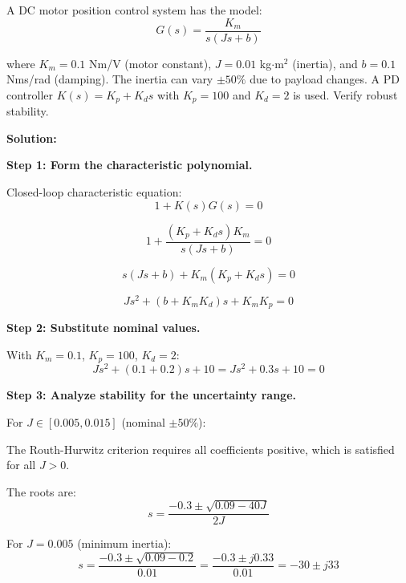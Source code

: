 \begin{example}
\label{ex:parametric_robustness}
A DC motor position control system has the model:
\begin{equation}
G(s) = \frac{K_m}{s(Js + b)}
\end{equation}

where $K_m = 0.1$ Nm/V (motor constant), $J = 0.01$ kg$\cdot$m$^2$ (inertia), and $b = 0.1$ Nms/rad (damping). The inertia can vary $\pm 50\%$ due to payload changes. A PD controller $K(s) = K_p + K_d s$ with $K_p = 100$ and $K_d = 2$ is used. Verify robust stability.

\textbf{Solution:}

\textbf{Step 1: Form the characteristic polynomial.}

Closed-loop characteristic equation:
\begin{equation}
1 + K(s)G(s) = 0
\end{equation}

\begin{equation}
1 + \frac{(K_p + K_d s)K_m}{s(Js + b)} = 0
\end{equation}

\begin{equation}
s(Js + b) + K_m(K_p + K_d s) = 0
\end{equation}

\begin{equation}
Js^2 + (b + K_m K_d)s + K_m K_p = 0
\end{equation}

\textbf{Step 2: Substitute nominal values.}

With $K_m = 0.1$, $K_p = 100$, $K_d = 2$:
\begin{equation}
Js^2 + (0.1 + 0.2)s + 10 = Js^2 + 0.3s + 10 = 0
\end{equation}

\textbf{Step 3: Analyze stability for the uncertainty range.}

For $J \in [0.005, 0.015]$ (nominal $\pm 50\%$):

The Routh-Hurwitz criterion requires all coefficients positive, which is satisfied for all $J > 0$.

The roots are:
\begin{equation}
s = \frac{-0.3 \pm \sqrt{0.09 - 40J}}{2J}
\end{equation}

For $J = 0.005$ (minimum inertia):
\begin{equation}
s = \frac{-0.3 \pm \sqrt{0.09 - 0.2}}{0.01} = \frac{-0.3 \pm j0.33}{0.01} = -30 \pm j33
\end{equation}


\end{example}

